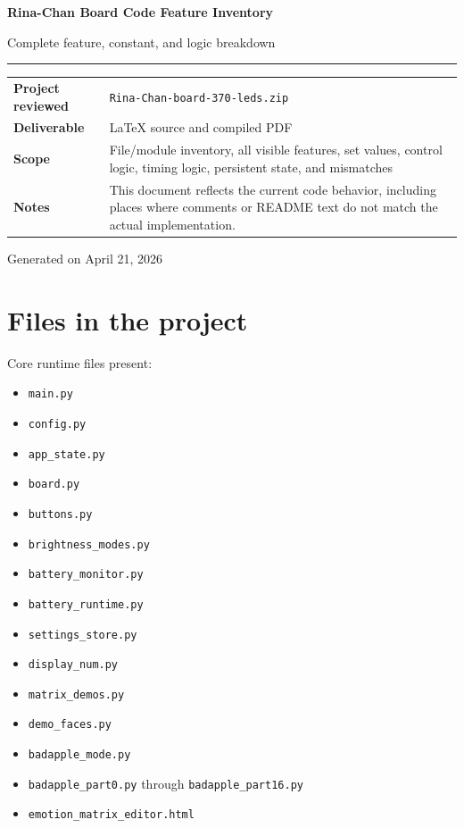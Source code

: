 \documentclass[11pt]{article}
\begin{document}
\begin{titlepage}
\centering
{\Huge\bfseries Rina-Chan Board Code Feature Inventory\par}
\vspace{0.8em}
{\Large Complete feature, constant, and logic breakdown\par}
\vspace{1.5em}
\rule{0.9\textwidth}{0.8pt}\par
\vspace{1.2em}
\begin{tabular}{>{\bfseries}p{}p{}}
Project reviewed & \texttt{Rina-Chan-board-370-leds.zip} \\
Deliverable & LaTeX source and compiled PDF \\
Scope & File/module inventory, all visible features, set values, control logic, timing logic, persistent state, and mismatches \\
Notes & This document reflects the current code behavior, including places where comments or README text do not match the actual implementation. \\
\end{tabular}
\vfill
{\large Generated on April 21, 2026\par}
\end{titlepage}

\tableofcontents
\newpage

\section{Files in the project}
Core runtime files present:
\begin{itemize}
  \item \texttt{main.py}
  \item \texttt{config.py}
  \item \texttt{app\_state.py}
  \item \texttt{board.py}
  \item \texttt{buttons.py}
  \item \texttt{brightness\_modes.py}
  \item \texttt{battery\_monitor.py}
  \item \texttt{battery\_runtime.py}
  \item \texttt{settings\_store.py}
  \item \texttt{display\_num.py}
  \item \texttt{matrix\_demos.py}
  \item \texttt{demo\_faces.py}
  \item \texttt{badapple\_mode.py}
  \item \texttt{badapple\_part0.py} through \texttt{badapple\_part16.py}
  \item \texttt{emotion\_matrix\_editor.html}
\end{itemize}
\end{document}
